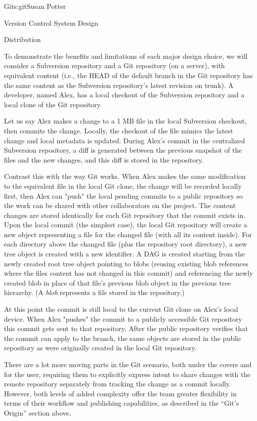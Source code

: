 \begin{aosachapter}{Git}{s:git}{Susan Potter}
\begin{aosasect1}{Version Control System Design}
\begin{aosasect2}{Distribution}
\end{aosasect2}

To demonstrate the benefits and limitations of each major design choice,
 we will consider a Subversion repository and a Git repository
(on a server), with equivalent content (i.e., the HEAD of the default
branch in the Git repository has the same content as the Subversion
repository's latest revision on trunk). A developer, named Alex,
has a local checkout of the Subversion repository and a local clone of the
Git repository.

Let us say Alex makes a change to a 1 MB file in the local Subversion
checkout, then commits the change. Locally, the checkout of the file mimics
the latest change and local metadata is updated. During Alex's commit in the centralized
Subversion repository, a diff is generated between the
previous snapshot of the files and the new changes, and this diff is stored
in the repository.

Contrast this with the way Git works.
When Alex makes the same modification to the equivalent file in the local
Git clone, the change will be recorded locally first, then Alex can "push"
the local pending commits to a public repository so the work can be shared
with other collaborators on the project. The content changes are
stored identically for each Git repository that the commit exists in. Upon
the local commit (the simplest case), the local Git repository will create a
new object representing a file for the changed file (with all its content
inside). For each directory above the changed file (plus the repository
root directory), a new tree object is created with a new identifier. A DAG
is created starting from the newly created root tree object pointing to
blobs (reusing existing blob references where the files content has not
changed in this commit) and referencing the newly created blob in place
of that file's previous blob object in the previous tree hierarchy. 
(A \emph{blob} represents
a file stored in the repository.) 

At this
point the commit is still local to the current Git clone on Alex's
local device. When Alex "pushes" the commit to a publicly accessible
Git repository this commit gets sent to that repository. After the public
repository verifies that the commit can apply to the branch, the same objects
are stored in the public repository as were originally created in the
local Git repository.

There are a lot more moving parts in the Git scenario, both under the
covers and for the user, requiring them to explicitly express intent to share
changes with the remote repository separately from tracking the change as a
commit locally. However, both levels of added complexity offer the team
greater flexibility in terms of their
workflow and publishing capabilities, as described in the ``Git's Origin'' section
above.


\end{aosasect1}
\end{aosachapter}
